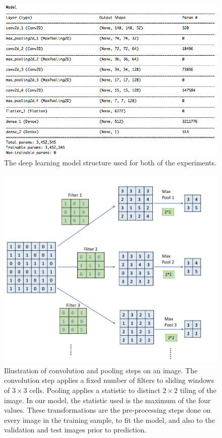 \documentclass[12pt]{article}
\begin{document}
\begin{figure}[h]
\centerline{\includegraphics[width=15cm]{figures/modelstruc.png}}
\caption{The deep learning model structure used for both of the experiments.}
\label{modelstruc}
\end{figure}

\begin{figure}[h]
\centerline{\includegraphics[width=15cm]{figures/diagconv.png}}
\caption{Illustration of convolution and pooling steps on an image. The convolution step applies a fixed number of filters to sliding windows of $3\times 3$ cells. Pooling applies a statistic to distinct $2\times 2$ tiling of the image. In our model, the statistic used is the maximum of the four values. These transformations are the pre-processing steps done on every image in the training sample, to fit the model, and also to the validation and test images prior to prediction. }
\label{diagconv}
\end{figure}
\end{document}
